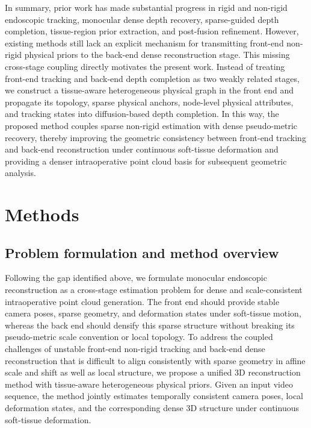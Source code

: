 \documentclass[pdflatex,sn-mathphys-num]{sn-jnl}
\begin{document}
In summary, prior work has made substantial progress in rigid and non-rigid endoscopic tracking, monocular dense depth recovery, sparse-guided depth completion, tissue-region prior extraction, and post-fusion refinement. However, existing methods still lack an explicit mechanism for transmitting front-end non-rigid physical priors to the back-end dense reconstruction stage. This missing cross-stage coupling directly motivates the present work. Instead of treating front-end tracking and back-end depth completion as two weakly related stages, we construct a tissue-aware heterogeneous physical graph in the front end and propagate its topology, sparse physical anchors, node-level physical attributes, and tracking states into diffusion-based depth completion. In this way, the proposed method couples sparse non-rigid estimation with dense pseudo-metric recovery, thereby improving the geometric consistency between front-end tracking and back-end reconstruction under continuous soft-tissue deformation and providing a denser intraoperative point cloud basis for subsequent geometric analysis.

\section{Methods}\label{sec:methods}

\subsection{Problem formulation and method overview}\label{subsec:method_overview}

Following the gap identified above, we formulate monocular endoscopic reconstruction as a cross-stage estimation problem for dense and scale-consistent intraoperative point cloud generation. The front end should provide stable camera poses, sparse geometry, and deformation states under soft-tissue motion, whereas the back end should densify this sparse structure without breaking its pseudo-metric scale convention or local topology. To address the coupled challenges of unstable front-end non-rigid tracking and back-end dense reconstruction that is difficult to align consistently with sparse geometry in affine scale and shift as well as local structure, we propose a unified 3D reconstruction method with tissue-aware heterogeneous physical priors. Given an input video sequence, the method jointly estimates temporally consistent camera poses, local deformation states, and the corresponding dense 3D structure under continuous soft-tissue deformation.
\end{document}
